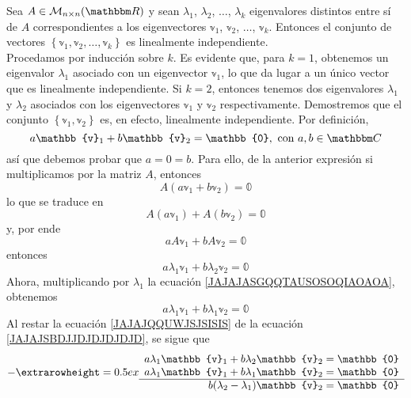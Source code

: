 \begin{theorem}\label{eigenvalores_distintos_eigenvectoresli}
    Sea $A \in \mathcal{M}_{n \times n}(\RR)$ y sean $\lambda_1$, $\lambda_2$, $\dots$, $\lambda_k$ eigenvalores distintos entre sí de $A$ correspondientes a los eigenvectores $\mathbb{v}_1$, $\mathbb{v}_2$, $\dots$, $\mathbb{v}_k$. Entonces el conjunto de vectores $\left\{ \mathbb{v}_1, \mathbb{v}_2, \dots, \mathbb{v}_k \right\}$ es linealmente independiente. \\
    \demostracion Procedamos por inducción sobre $k$. Es evidente que, para $k = 1$, obtenemos un eigenvalor $\lambda_1$ asociado con un eigenvector $\mathbb{v}_1$, lo que da lugar a un único vector que es linealmente independiente. Si $k = 2$, entonces tenemos dos eigenvalores $\lambda_1$ y $\lambda_2$ asociados con los eigenvectores $\mathbb{v}_1$ y $\mathbb{v}_2$ respectivamente. Demostremos que el conjunto $\left\{ \mathbb{v}_1, \mathbb{v}_2 \right\}$ es, en efecto, linealmente independiente. Por definición,
    \begin{equation}
        a\mathbb{v}_1 + b\mathbb{v}_2 = \mathbb{0}, \text{ con } a, b \in \CC \label{JAJAJASGQQTAUSOSOQIAOAOA}
    \end{equation}
    así que debemos probar que $a = 0 = b$. Para ello, de la anterior expresión si multiplicamos por la matriz $A$, entonces
    $$A \left( a\mathbb{v}_1 + b\mathbb{v}_2 \right) = \mathbb{0}$$
    lo que se traduce en
    $$A(a\mathbb{v}_1) + A(b\mathbb{v}_2) = \mathbb{0}$$
    y, por ende
    $$aA\mathbb{v}_1 + bA\mathbb{v}_2 = \mathbb{0}$$
    entonces
    \begin{equation}
        a \lambda_1 \mathbb{v}_1 + b \lambda_2 \mathbb{v}_2 = \mathbb{0} \label{JAJAJSBDJJDJDJDJDJD}
    \end{equation}
    Ahora, multiplicando por $\lambda_1$ la ecuación \eqref{JAJAJASGQQTAUSOSOQIAOAOA}, obtenemos
    \begin{equation}
        a \lambda_1 \mathbb{v}_1 + b \lambda_1 \mathbb{v}_2 = \mathbb{0} \label{JAJAJQQUWJSJSISIS}
    \end{equation}
    Al restar la ecuación \eqref{JAJAJQQUWJSJSISIS} de la ecuación \eqref{JAJAJSBDJJDJDJDJDJD}, se sigue que
    $$- {\extrarowheight = 0.5ex
    \begin{array}{r}
        a\lambda_1\mathbb{v}_1 + b\lambda_2\mathbb{v}_2 = \mathbb{0} \\
        a\lambda_1\mathbb{v}_1 + b\lambda_1\mathbb{v}_2 = \mathbb{0} \\
        \hline
        b (\lambda_2 - \lambda_1) \mathbb{v}_2 = \mathbb{0}

\end{array}}$$
\end{theorem}
